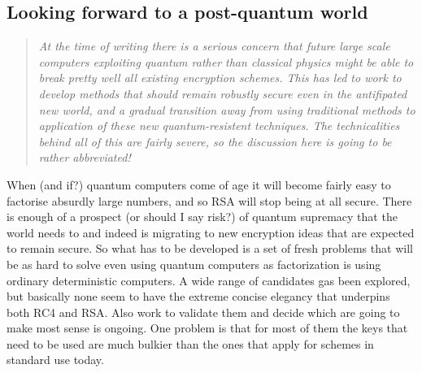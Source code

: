 \subsection{Looking forward to a post-quantum world}
\begin{quotation}\textit{
At the time of writing there is a serious concern that future large scale
computers exploiting quantum rather than classical physics might be able
to break pretty well all existing encryption schemes. This has led to
work to develop methods that should remain robustly secure even in the
antifipated new world, and a gradual transition away from using traditional
methods to application of these new quantum-resistent techniques. The
technicalities behind all of this are fairly severe, so the discussion
here is going to be rather abbreviated!
}\end{quotation}
When (and if?) quantum computers come of age it will become fairly easy to
factorise absurdly large numbers, and so RSA will stop being at all secure.
There is enough of a prospect (or should I say risk?) of quantum supremacy
that the world needs to and indeed is migrating to new encryption ideas that
are expected to remain secure. So what has to be developed is a set of fresh
problems that will be as hard to solve even using quantum computers as
factorization is using ordinary deterministic computers. A wide range of
candidates gas been explored, but basically none seem to have the extreme
concise elegancy that underpins both RC4 and RSA. Also work to validate them and
decide which are going to make most sense is ongoing. One problem is that
for most of them the keys that need to be used are much bulkier than the
ones that apply for schemes in standard use today.

